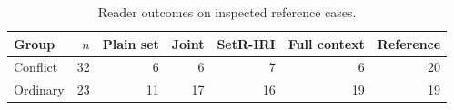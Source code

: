 \begin{table}[pos=H]
\caption{Reader outcomes on inspected reference cases.}\label{tab:source-reference}
\centering\small
\setlength{\tabcolsep}{6pt}
\begin{tabular}{lrrrrrr}
\toprule
Group & $n$ & Plain set & Joint & SetR-IRI & Full context & Reference \\
\midrule
Conflict & 32 & 6 & 6 & 7 & 6 & 20 \\
Ordinary & 23 & 11 & 17 & 16 & 19 & 19 \\
\bottomrule
\end{tabular}
\end{table}
